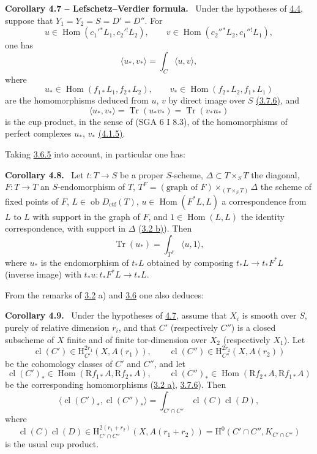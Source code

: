\documentclass[11pt]{article}
\newenvironment{statement}[1]{\par\medskip\noindent\textbf{#1.}\ }{\par\medskip}
\renewcommand{\H}{\mathrm{H}}
\DeclareMathOperator{\Hom}{Hom}
\newcommand{\R}{\mathrm{R}}
\newcommand{\ob}{\operatorname{ob}}
\providecommand{\Dctf}{D_{\mathrm{ctf}}}
\providecommand{\cl}{\operatorname{cl}}
\providecommand{\Tr}{\operatorname{Tr}}
\providecommand{\Tr}{\operatorname{Tr}}
\providecommand{\Dctf}{D_{\mathrm{ctf}}}
\providecommand{\Tr}{\operatorname{Tr}}
\providecommand{\Hom}{\operatorname{Hom}}
\providecommand{\ob}{\operatorname{ob}}
\providecommand{\R}{\mathrm R}
\providecommand{\Tr}{\operatorname{Tr}}
\providecommand{\cl}{\operatorname{cl}}
\providecommand{\Hom}{\operatorname{Hom}}
\providecommand{\cl}{\operatorname{cl}}
\providecommand{\Tr}{\operatorname{Tr}}
\begin{document}
\label{sga5:III:corollary:4.7}\begin{statement}{Corollary 4.7 -- Lefschetz--Verdier formula}
Under the hypotheses of \hyperref[sga5:III:theorem:4.4]{4.4}, suppose that $Y_1=Y_2=S=D'=D''$. For
\[
u\in\Hom(c_1'{}^*L_1,c_2'{}^!L_2),\qquad
v\in\Hom(c_2''{}^*L_2,c_1''{}^!L_1),
\]
one has
\begin{equation}
\tag{4.7.1}\label{sga5:III:equation:4.7.1}
\langle u_*,v_*\rangle=\int_C\langle u,v\rangle,
\end{equation}
where
\[
u_*\in\Hom(f_{1*}L_1,f_{2*}L_2),\qquad
v_*\in\Hom(f_{2*}L_2,f_{1*}L_1)
\]
are the homomorphisms deduced from $u$, $v$ by direct image over $S$ \hyperref[sga5:III:equation:3.7.6]{(3.7.6)}, and
\[
\langle u_*,v_*\rangle=\Tr(u_*v_*)=\Tr(v_*u_*)
\]
is the cup product, in the sense of (SGA 6 I 8.3), of the homomorphisms of perfect complexes $u_*$, $v_*$ \hyperref[sga5:III:equation:4.1.5]{(4.1.5)}.
\end{statement}

Taking \hyperref[sga5:III:subsection:3.6.5]{3.6.5} into account, in particular one has:

\label{sga5:III:corollary:4.8}\begin{statement}{Corollary 4.8}
Let $t:T\longrightarrow S$ be a proper $S$-scheme, $\Delta\subset T\times_S T$ the diagonal, $F:T\longrightarrow T$ an $S$-endomorphism of $T$, $T^F=(\text{graph of }F)\times_{(T\times_S T)}\Delta$ the scheme of fixed points of $F$, $L\in\ob\Dctf(T)$, $u\in\Hom(F^*L,L)$ a correspondence from $L$ to $L$ with support in the graph of $F$, and $1\in\Hom(L,L)$ the identity correspondence, with support in $\Delta$ (\hyperref[sga5:III:subsection:3.2]{3.2 b)}). Then
\[
\Tr(u_*)=\int_{T^F}\langle u,1\rangle,
\]
where $u_*$ is the endomorphism of $t_*L$ obtained by composing $t_*L\longrightarrow t_*F^*L$ (inverse image) with $t_*u:t_*F^*L\longrightarrow t_*L$.
\end{statement}

From the remarks of \hyperref[sga5:III:subsection:3.2]{3.2} a) and \hyperref[sga5:III:subsection:3.6]{3.6} one also deduces:

\label{sga5:III:corollary:4.9}\begin{statement}{Corollary 4.9}
Under the hypotheses of \hyperref[sga5:III:corollary:4.7]{4.7}, assume that $X_i$ is smooth over $S$, purely of relative dimension $r_i$, and that $C'$ (respectively $C''$) is a closed subscheme of $X$ finite and of finite tor-dimension over $X_2$ (respectively $X_1$). Let
\[
\cl(C')\in \H_{C'}^{2r_1}(X,A(r_1)),\qquad
\cl(C'')\in \H_{C''}^{2r_2}(X,A(r_2))
\]
be the cohomology classes of $C'$ and $C''$, and let
\[
\cl(C')_*\in\Hom(\R f_{1*}A,\R f_{2*}A),\qquad
\cl(C'')_*\in\Hom(\R f_{2*}A,\R f_{1*}A)
\]
be the corresponding homomorphisms (\hyperref[sga5:III:subsection:3.2]{3.2 a)}, \hyperref[sga5:III:equation:3.7.6]{3.7.6}). Then
\[
\langle \cl(C')_*,\cl(C'')_*\rangle
=
\int_{C'\cap C''}\cl(C)\cl(D),
\]
where
\[
\cl(C)\cl(D)\in
\H_{C'\cap C''}^{2(r_1+r_2)}(X,A(r_1+r_2))
=
\H^0(C'\cap C'',K_{C'\cap C''})
\]
is the usual cup product.
\end{statement}
\end{document}
